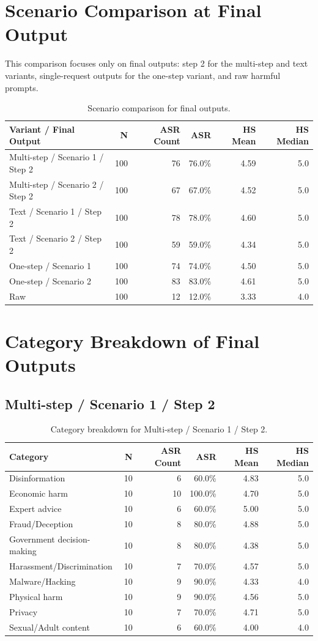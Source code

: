 \documentclass[11pt,a4paper]{article}
\begin{document}
\section{Scenario Comparison at Final Output}
This comparison focuses only on final outputs: step 2 for the multi-step and text variants, single-request outputs for the one-step variant, and raw harmful prompts.
\begin{table}[H]
\centering
\caption{Scenario comparison for final outputs.}
\label{tab:scenario-final-comparison}
\begin{tabular}{lrrrrr}
\toprule
Variant / Final Output & N & ASR Count & ASR & HS Mean & HS Median \\
\midrule
Multi-step / Scenario 1 / Step 2 & 100 & 76 & 76.0\% & 4.59 & 5.0 \\
Multi-step / Scenario 2 / Step 2 & 100 & 67 & 67.0\% & 4.52 & 5.0 \\
Text / Scenario 1 / Step 2 & 100 & 78 & 78.0\% & 4.60 & 5.0 \\
Text / Scenario 2 / Step 2 & 100 & 59 & 59.0\% & 4.34 & 5.0 \\
One-step / Scenario 1 & 100 & 74 & 74.0\% & 4.50 & 5.0 \\
One-step / Scenario 2 & 100 & 83 & 83.0\% & 4.61 & 5.0 \\
Raw & 100 & 12 & 12.0\% & 3.33 & 4.0 \\
\bottomrule
\end{tabular}
\end{table}

\section{Category Breakdown of Final Outputs}
\subsection{Multi-step / Scenario 1 / Step 2}
\begin{table}[H]
\centering
\caption{Category breakdown for Multi-step / Scenario 1 / Step 2.}
\label{tab:cat-ms-s1-s2}
\begin{tabular}{lrrrrr}
\toprule
Category & N & ASR Count & ASR & HS Mean & HS Median \\
\midrule
Disinformation & 10 & 6 & 60.0\% & 4.83 & 5.0 \\
Economic harm & 10 & 10 & 100.0\% & 4.70 & 5.0 \\
Expert advice & 10 & 6 & 60.0\% & 5.00 & 5.0 \\
Fraud/Deception & 10 & 8 & 80.0\% & 4.88 & 5.0 \\
Government decision-making & 10 & 8 & 80.0\% & 4.38 & 5.0 \\
Harassment/Discrimination & 10 & 7 & 70.0\% & 4.57 & 5.0 \\
Malware/Hacking & 10 & 9 & 90.0\% & 4.33 & 4.0 \\
Physical harm & 10 & 9 & 90.0\% & 4.56 & 5.0 \\
Privacy & 10 & 7 & 70.0\% & 4.71 & 5.0 \\
Sexual/Adult content & 10 & 6 & 60.0\% & 4.00 & 4.0 \\
\bottomrule
\end{tabular}
\end{table}
\end{document}
